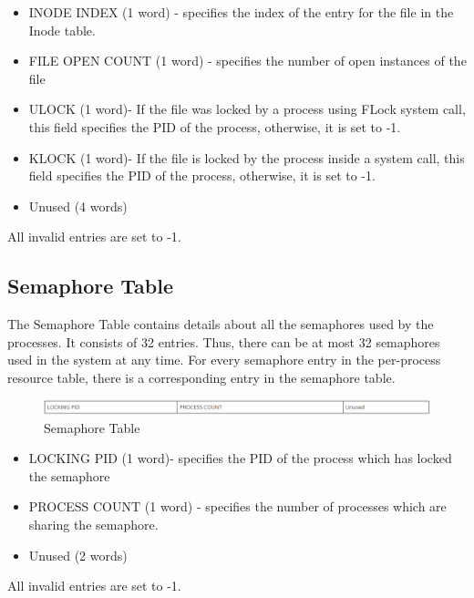 \begin {itemize}
\item INODE INDEX (1 word) - specifies the index of the entry for the file in the Inode table.
\item FILE OPEN COUNT (1 word) - specifies the number of open instances of the file
\item ULOCK (1 word)- If the file was locked by a process using FLock system call, this field specifies the PID of the process, otherwise, it is set to -1.
\item KLOCK (1 word)- If the file is locked by the process inside a system call, this field specifies the PID of the process, otherwise, it is set to -1.
\item Unused (4 words)
\end {itemize}
All invalid entries are set to -1.

\subsection{Semaphore Table}

The Semaphore Table contains details about all the semaphores used by the processes. It consists of 32 entries. Thus, there can be at most 32 semaphores used in the system at any time. For every semaphore entry in the per-process resource table, there is a corresponding entry in the semaphore table.
\\
\begin{figure}[ht]
\centering
\includegraphics  [scale=0.55]{figures/st.png}
\caption{\footnotesize Semaphore Table}
\end{figure}

\begin {itemize}

\item LOCKING PID (1 word)- specifies the PID of the process which has locked the semaphore
\item PROCESS COUNT (1 word) - specifies the number of processes which are sharing the semaphore.
\item Unused (2 words)
\end {itemize}

All invalid entries are set to -1.

